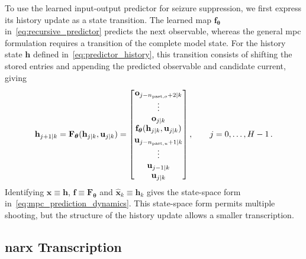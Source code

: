 To use the learned input-output predictor for seizure suppression, we first express its history update as a state transition.
The learned map $\mathbf f_{\boldsymbol\theta}$ in~\eqref{eq:recursive_predictor} predicts the next observable, whereas the general \ac{mpc} formulation requires a transition of the complete model state.
For the history state $\mathbf h$ defined in~\eqref{eq:predictor_history}, this transition consists of shifting the stored entries and appending the predicted observable and candidate current, giving
%
\begin{equation}
    \mathbf h_{j+1|k}
    =\mathbf F_{\boldsymbol\theta}(\mathbf h_{j|k},\mathbf u_{j|k})
    =\begin{bmatrix}
        \mathbf o_{j-n_{\mathrm{past},o}+2|k}\\
        \vdots\\
        \mathbf o_{j|k}\\
        \mathbf f_{\boldsymbol\theta}(\mathbf h_{j|k},\mathbf u_{j|k})\\[2pt]
        \mathbf u_{j-n_{\mathrm{past},u}+1|k}\\
        \vdots\\
        \mathbf u_{j-1|k}\\
        \mathbf u_{j|k}
    \end{bmatrix},
    \qquad j=0,\ldots,H-1\,.
    \label{eq:mpc_history_transition}
\end{equation}
%
Identifying $\mathbf x\equiv\mathbf h$, $\mathbf f\equiv\mathbf F_{\boldsymbol\theta}$ and $\hat{\mathbf x}_k\equiv\mathbf h_k$ gives the state-space form in~\eqref{eq:mpc_prediction_dynamics}.
This state-space form permits multiple shooting, but the structure of the history update allows a smaller transcription.

\subsection{\acs*{narx} Transcription}

